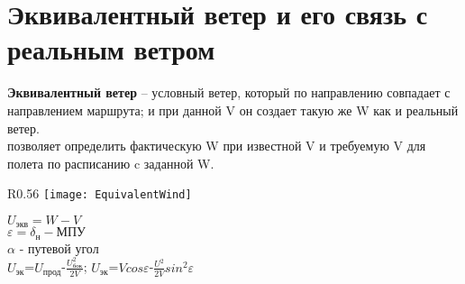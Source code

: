 
\section{Эквивалентный ветер и его связь с реальным ветром}
\textbf{Эквивалентный ветер} – условный ветер, который по направлению совпадает с направлением маршрута; и при данной V он создает такую же W как и реальный ветер.\\
позволяет определить фактическую W при известной V и требуемую V для полета по расписанию c заданной W.

\begin{wrapfigure}[3]{R}{0.56\linewidth}
	\vspace{-6mm}
	\texttt{[image: EquivalentWind]}
\end{wrapfigure}

$U_\text{экв}=W-V$\\
$\varepsilon=\delta_\text{н}-\text{МПУ}$\\
$\alpha$ - путевой угол\\
 $U_\text{эк}$=$U_\text{прод}$-$\frac{U_\text{бок}^2}{2V}$; $U_\text{эк}$=$Vcos\varepsilon$-$\frac{U^2}{2V}sin^2\varepsilon$
